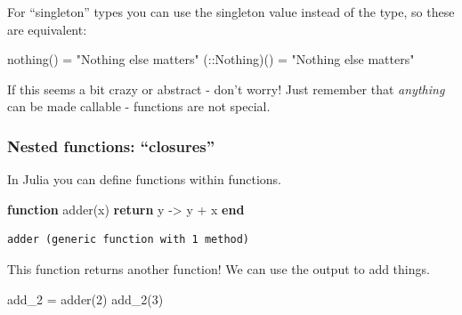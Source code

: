 \documentclass[
]{article}
\newenvironment{Shaded}{\begin{snugshade}}{\end{snugshade}}
\newcommand{\ControlFlowTok}[1]{\textcolor[rgb]{0.00,0.23,0.31}{\textbf{#1}}}
\newcommand{\DataTypeTok}[1]{\textcolor[rgb]{0.68,0.00,0.00}{#1}}
\newcommand{\FloatTok}[1]{\textcolor[rgb]{0.68,0.00,0.00}{#1}}
\newcommand{\FunctionTok}[1]{\textcolor[rgb]{0.28,0.35,0.67}{#1}}
\newcommand{\KeywordTok}[1]{\textcolor[rgb]{0.00,0.23,0.31}{\textbf{#1}}}
\newcommand{\NormalTok}[1]{\textcolor[rgb]{0.00,0.23,0.31}{#1}}
\newcommand{\OperatorTok}[1]{\textcolor[rgb]{0.37,0.37,0.37}{#1}}
\newcommand{\SpecialCharTok}[1]{\textcolor[rgb]{0.37,0.37,0.37}{#1}}
\newcommand{\StringTok}[1]{\textcolor[rgb]{0.13,0.47,0.30}{#1}}
\begin{document}
\begin{Shaded}
\end{Shaded}

For ``singleton'' types you can use the singleton value instead of the
type, so these are equivalent:

\begin{Shaded}
\begin{Highlighting}[]
\FunctionTok{nothing}\NormalTok{() }\OperatorTok{=} \StringTok{"Nothing else matters"}
\NormalTok{(}\OperatorTok{::}\DataTypeTok{Nothing}\NormalTok{)() }\OperatorTok{=} \StringTok{"Nothing else matters"}
\end{Highlighting}
\end{Shaded}

If this seems a bit crazy or abstract - don't worry! Just remember that
\emph{anything} can be made callable - functions are not special.

\subsubsection{Nested functions:
``closures''}\label{nested-functions-closures}

In Julia you can define functions within functions.

\begin{Shaded}
\begin{Highlighting}[]
\KeywordTok{function} \FunctionTok{adder}\NormalTok{(x)}
   \ControlFlowTok{return}\NormalTok{ y }\OperatorTok{{-}\textgreater{}}\NormalTok{ y }\OperatorTok{+}\NormalTok{ x}
\KeywordTok{end}
\end{Highlighting}
\end{Shaded}

\begin{verbatim}
adder (generic function with 1 method)
\end{verbatim}

This function returns another function! We can use the output to add
things.

\begin{Shaded}
\begin{Highlighting}[]
\NormalTok{add\_2 }\OperatorTok{=} \FunctionTok{adder}\NormalTok{(}\FloatTok{2}\NormalTok{)}
\FunctionTok{add\_2}\NormalTok{(}\FloatTok{3}\NormalTok{)}
\end{Highlighting}
\end{Shaded}
\end{document}
